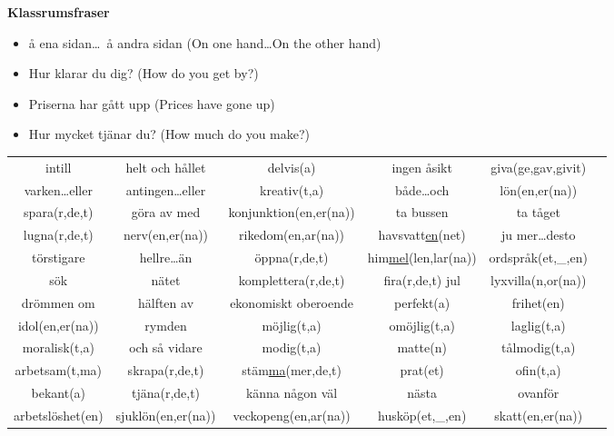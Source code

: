 
\begin{flushleft}
    \textbf{Klassrumsfraser}
    \begin{itemize}
        \item å ena sidan\ldots\ å andra sidan (On one hand\ldots On the other hand)
        \item Hur klarar du dig? (How do you get by?)
        \item Priserna har gått upp (Prices have gone up)
        \item Hur mycket tjänar du? (How much do you make?)
    \end{itemize}
\end{flushleft}

\begin{center}
    \begin{adjustwidth}{-2.5cm}{}
        \begin{tabular}{|c c c c c c|}
            \hline
            intill & helt och hållet & delvis(a) & ingen åsikt & giva(ge,gav,givit) &  \\
            varken\ldots eller & antingen\ldots eller & kreativ(t,a) & både\ldots och & lön(en,er(na)) &  \\
            spara(r,de,t) & göra av med & konjunktion(en,er(na)) & ta bussen & ta tåget &  \\
            lugna(r,de,t) & nerv(en,er(na)) & rikedom(en,ar(na)) & havsvatt\underline{en}(net) & ju mer\ldots desto &  \\
            törstigare & hellre\ldots än & öppna(r,de,t) & him\underline{mel}(len,lar(na)) & ordspråk(et,\_,en) &  \\
            sök & nätet & komplettera(r,de,t) & fira(r,de,t) jul & lyxvilla(n,or(na)) &  \\
            drömmen om & hälften av & ekonomiskt oberoende & perfekt(a) & frihet(en) &  \\
            idol(en,er(na)) & rymden & möjlig(t,a) & omöjlig(t,a) & laglig(t,a) &  \\
            moralisk(t,a) & och så vidare & modig(t,a) & matte(n) & tålmodig(t,a) &  \\
            arbetsam(t,ma) & skrapa(r,de,t) & stäm\underline{ma}(mer,de,t) & prat(et) & ofin(t,a) &  \\
            bekant(a) & tjäna(r,de,t) & känna någon väl & nästa & ovanför &  \\
            arbetslöshet(en) & sjuklön(en,er(na)) & veckopeng(en,ar(na)) & husköp(et,\_,en) & skatt(en,er(na)) &  \\

\end{tabular}
\end{adjustwidth}
\end{center}

